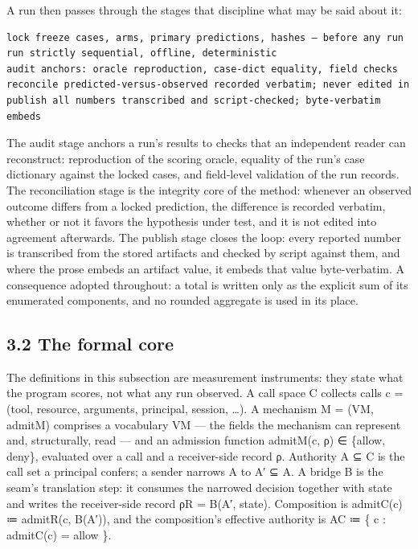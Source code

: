 \documentclass[
  10pt,
]{article}
\renewcommand{\_}{\allowbreak\origunderscore}
\begin{document}
A run then passes through the stages that discipline what may be said
about it:

\begin{verbatim}
lock freeze cases, arms, primary predictions, hashes — before any run
run strictly sequential, offline, deterministic
audit anchors: oracle reproduction, case-dict equality, field checks
reconcile predicted-versus-observed recorded verbatim; never edited in
publish all numbers transcribed and script-checked; byte-verbatim embeds
\end{verbatim}

The audit stage anchors a run's results to checks that an independent
reader can reconstruct: reproduction of the scoring oracle, equality of
the run's case dictionary against the locked cases, and field-level
validation of the run records. The reconciliation stage is the integrity
core of the method: whenever an observed outcome differs from a locked
prediction, the difference is recorded verbatim, whether or not it
favors the hypothesis under test, and it is not edited into agreement
afterwards. The publish stage closes the loop: every reported number is
transcribed from the stored artifacts and checked by script against
them, and where the prose embeds an artifact value, it embeds that value
byte-verbatim. A consequence adopted throughout: a total is written only
as the explicit sum of its enumerated components, and no rounded
aggregate is used in its place.

\subsection{3.2 The formal core}\label{the-formal-core}

The definitions in this subsection are measurement instruments: they
state what the program scores, not what any run observed. A call space C
collects calls c = (tool, resource, arguments, principal, session,
\ldots). A mechanism M = (V\_M, admit\_M) comprises a vocabulary V\_M
--- the fields the mechanism can represent and, structurally, read ---
and an admission function admit\_M(c, ρ) ∈ \{allow, deny\}, evaluated
over a call and a receiver-side record ρ. Authority A ⊆ C is the call
set a principal confers; a sender narrows A to A′ ⊆ A. A bridge B is the
seam's translation step: it consumes the narrowed decision together with
state and writes the receiver-side record \mbox{ρ\_R} = B(A′, state).
Composition is admit\_C(c) ≔ admit\_R(c, B(A′)), and the composition's
effective authority is A\_C ≔ \{ c : admit\_C(c) = allow \}.
\end{document}
